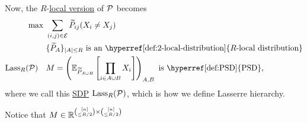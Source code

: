 Now, the \(R\)-\hyperref[def:local-distribution]{local version} of \(\mathcal{\MakeUppercase{p}} \) becomes
\[
	\begin{aligned}
		\max~                                                                & \sum_{(i, j)\in \mathcal{\MakeUppercase{e}} } \widetilde{P} _{ij} (X_i \neq X_j)                                                                              \\
		                                                                     & \{\widetilde{P} _A\}_{\left\vert A \right\vert \leq R} \text{ is an \hyperref[def:2-local-distribution]{\(R\)-local distribution}}                            \\
		\mathop{\mathrm{Lass}}\nolimits_R(\mathcal{\MakeUppercase{p}} )\quad & M = \left( \mathbb{\MakeUppercase{e}}_{\widetilde{P} _{A \cup B}} \left[ \prod_{i\in A \cup B} X_i \right] \right) _{A, B}\text{ is \hyperref[def:PSD]{PSD}},
	\end{aligned}
\]
where we call this \hyperref[def:SDP]{SDP} \(\mathop{\mathrm{Lass}}_R(\mathcal{\MakeUppercase{p}} )\), which is how we define Lasserre hierarchy.

\begin{note}
	Notice that \(M\in \mathbb{\MakeUppercase{r}} ^{\binom{[n]}{\leq R / 2} \times \binom{[n]}{\leq R / 2}}\)
\end{note}